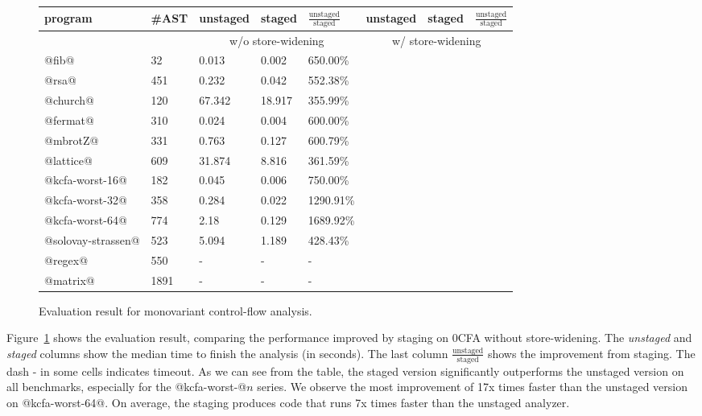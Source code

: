 \begin{figure}[h]
\footnotesize
\begin{tabular}{@{}ll|lll|lll@{}}
\toprule
    program             &\#AST & unstaged   & staged     & $\frac{\text{unstaged}}{\text{staged}}$ & unstaged   & staged    & $\frac{\text{unstaged}}{\text{staged}}$  \\ 
    \midrule
                        &      & \multicolumn{3}{c}{w/o store-widening}  &  \multicolumn{3}{c}{w/ store-widening}  \\
    \midrule
    @fib@               & 32   & 0.013      & 0.002      & 650.00\%  & & &        \\
    @rsa@               & 451  & 0.232      & 0.042      & 552.38\%  & & &        \\
    @church@            & 120  & 67.342     & 18.917     & 355.99\%  & & &        \\
    @fermat@            & 310  & 0.024      & 0.004      & 600.00\%  & & &        \\
    @mbrotZ@            & 331  & 0.763      & 0.127      & 600.79\%  & & &        \\
    @lattice@           & 609  & 31.874     & 8.816      & 361.59\%  & & &       \\
    @kcfa-worst-16@     & 182  & 0.045      & 0.006      & 750.00\%  & & &      \\
    @kcfa-worst-32@     & 358  & 0.284      & 0.022      & 1290.91\% & & &      \\
    @kcfa-worst-64@     & 774  & 2.18       & 0.129      & 1689.92\% & & &      \\
    @solovay-strassen@  & 523  & 5.094      & 1.189      & 428.43\%  & & &       \\
    @regex@             & 550  & -          & -          & -         & & &       \\
    @matrix@            & 1891 & -          & -          & -         & & &       \\
    \bottomrule
\end{tabular}
\caption{Evaluation result for monovariant control-flow analysis.} \label{evaluation_result}
\end{figure}

Figure~\ref{evaluation_result} shows the evaluation result, comparing the
performance improved by staging on 0CFA without store-widening. The
\textit{unstaged} and \textit{staged} columns show the median time to finish the
analysis (in seconds). The last column $\frac{\text{unstaged}}{\text{staged}}$
shows the improvement from staging. The dash - in some cells indicates timeout.
As we can see from the table, the staged version significantly outperforms the
unstaged version on all benchmarks, especially for the @kcfa-worst-@$n$ series.
We observe the most improvement of 17x times faster than the unstaged version on
@kcfa-worst-64@. On average, the staging produces code that runs 7x times faster
than the unstaged analyzer.

